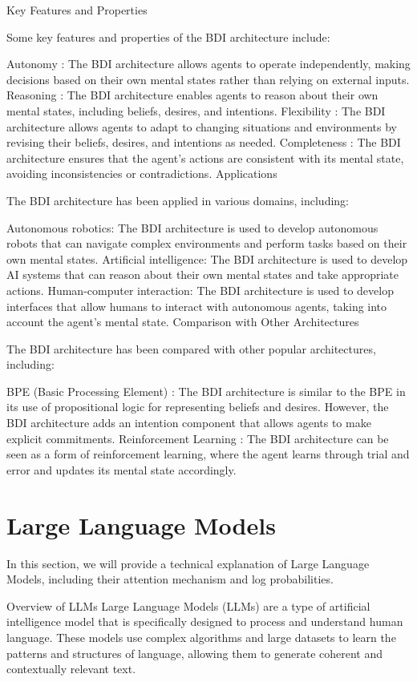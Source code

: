 Key Features and Properties

Some key features and properties of the BDI architecture include:

Autonomy : The BDI architecture allows agents to operate independently, making
decisions based on their own mental states rather than relying on external
inputs. Reasoning : The BDI architecture enables agents to reason about their own
mental states, including beliefs, desires, and intentions. Flexibility : The BDI
architecture allows agents to adapt to changing situations and environments by revising
their beliefs, desires, and intentions as needed. Completeness : The BDI
architecture ensures that the agent's actions are consistent with its mental
state, avoiding inconsistencies or contradictions. Applications

The BDI architecture has been applied in various domains, including:

Autonomous robotics: The BDI architecture is used to develop autonomous robots that
can navigate complex environments and perform tasks based on their own mental states.
Artificial intelligence: The BDI architecture is used to develop AI systems that
can reason about their own mental states and take appropriate actions. Human-computer
interaction: The BDI architecture is used to develop interfaces that allow humans
to interact with autonomous agents, taking into account the agent's mental state.
Comparison with Other Architectures

The BDI architecture has been compared with other popular architectures, including:

BPE (Basic Processing Element) : The BDI architecture is similar to the BPE in its
use of propositional logic for representing beliefs and desires. However, the BDI
architecture adds an intention component that allows agents to make explicit commitments.
Reinforcement Learning : The BDI architecture can be seen as a form of
reinforcement learning, where the agent learns through trial and error and updates
its mental state accordingly.

\section{Large Language Models}
In this section, we will provide a technical explanation of Large Language
Models, including their attention mechanism and log probabilities.

Overview of LLMs Large Language Models (LLMs) are a type of artificial intelligence
model that is specifically designed to process and understand human language.
These models use complex algorithms and large datasets to learn the patterns and
structures of language, allowing them to generate coherent and contextually relevant
text.

